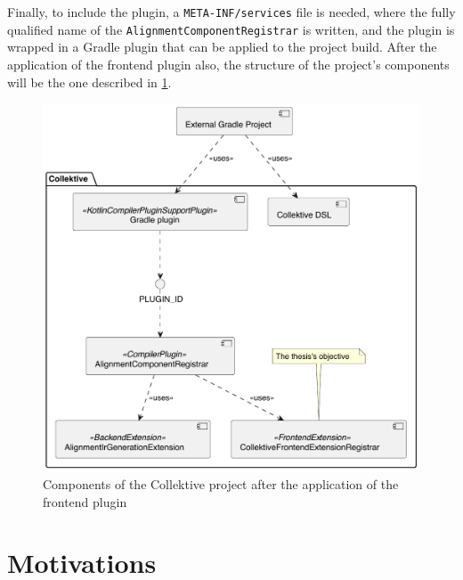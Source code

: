 \documentclass[12pt,a4paper,openright,twoside]{book}
\begin{document}
Finally, to include the plugin, a \lstinline{META-INF/services} file is needed,
where the fully qualified name of the \lstinline{AlignmentComponentRegistrar} is
written, and the plugin is wrapped in a Gradle plugin that can be applied to the
project build. After the application of the frontend plugin also, the structure
of the project's components will be the one described in
\cref{fig:collektive-components-diagram}.

\begin{figure}
  \centering
  \includegraphics[width=.6\linewidth]{figures/collektive-components.pdf}
  \caption{Components of the Collektive project after the application of the frontend plugin}
  \label{fig:collektive-components-diagram}
\end{figure}

\section{Motivations}
\end{document}
